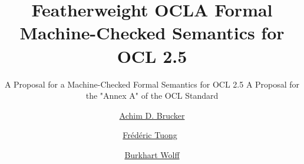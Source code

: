 \documentclass[10pt,DIV12,a4paper,openright,twoside,abstracton]{scrreprt}
\begin{document}
\renewcommand{\subsubsectionautorefname}{Section}
\renewcommand{\subsectionautorefname}{Section}
\renewcommand{\sectionautorefname}{Section}
\renewcommand{\chapterautorefname}{Chapter}
\newcommand{\subtableautorefname}{\tableautorefname}
\newcommand{\subfigureautorefname}{\figureautorefname}

\newenvironment{matharray}[1]{\[\begin{array}{#1}}{\end{array}\]} %
\newcommand{\indexdef}[3]%
{\ifthenelse{\equal{}{#1}}{\index{#3 (#2)|bold}}{\index{#3 (#1\ #2)|bold}}} %



\isatagafp
  \title{Featherweight OCL}
  \subtitle{A Proposal for a Machine-Checked Formal Semantics for OCL 2.5 %
  }
\endisatagafp
\isatagannexa
  \title{A Formal Machine-Checked Semantics for OCL 2.5}
  \subtitle{A Proposal for the "Annex A" of the OCL Standard}
\endisatagannexa
\author{%
  \href{http://www.brucker.ch/}{Achim D. Brucker}\footnotemark[1]
  \and
  \href{https://www.lri.fr/~tuong/}{Fr\'ed\'eric Tuong}\footnotemark[2]~\footnotemark[3]
  \and
  \href{https://www.lri.fr/~wolff/}{Burkhart Wolff}\footnotemark[2]}
\publishers{%
  \footnotemark[1]~SAP SE\\
  Vincenz-Priessnitz-Str. 1, 76131 Karlsruhe,
  Germany \texorpdfstring{\\}{} \href{mailto:"Achim D. Brucker"
    <achim.brucker@sap.com>}{achim.brucker@sap.com}\\[2em]
  \footnotemark[2]~LRI, Univ Paris Sud, CNRS, CentraleSup\'elec, Universit\'e Paris-Saclay  \\
  b\^at. 650, 91405 Orsay, France \texorpdfstring{\\}{} \href{mailto:"Burkhart Wolff"
    <burkhart.wolff@lri.fr>}{burkhart.wolff@lri.fr}\\[2em]
  \footnotemark[3]~IRT SystemX\\
  8 av.~de la Vauve, 91120 Palaiseau,
  France\\
    frederic.tuong@\{u-psud, irt-systemx, lri\}.fr
}


\maketitle
\isatagannexa
\cleardoublepage
\endisatagannexa
\end{document}
